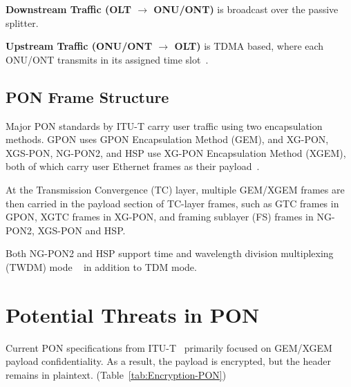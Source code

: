 \documentclass[sigconf]{acmart}
\begin{document}
\textbf{Downstream Traffic (OLT $\rightarrow$ ONU/ONT)} is broadcast over the passive splitter. 


\textbf{Upstream Traffic (ONU/ONT $\rightarrow$ OLT)} is TDMA based, where each ONU/ONT transmits in its assigned time slot~\cite{novelapon}. 



\subsection{PON Frame Structure}
Major PON standards by ITU-T carry user traffic using two encapsulation methods. GPON uses GPON Encapsulation Method (GEM), and XG-PON, XGS-PON, NG-PON2, and HSP use XG-PON Encapsulation Method (XGEM), both of which carry user Ethernet frames as their payload~\cite{itu-g9843,itu-XGPON,itu-XGSPON,itu-NGPON2,itu-50GPON}.

At the Transmission Convergence (TC) layer, multiple GEM/XGEM frames are then carried in the payload section of TC-layer frames, such as GTC frames in GPON, XGTC frames in XG-PON, and framing sublayer (FS) frames in NG-PON2, XGS-PON and HSP.

Both NG-PON2 and HSP support time and wavelength division multiplexing (TWDM) mode ~\cite{itu-NGPON2,itu-50GPON} in addition to TDM mode.


\section{Potential Threats in PON}
Current PON specifications from ITU-T~\cite{itu-g9843,itu-XGPON,itu-XGSPON,itu-NGPON2,itu-50GPON} primarily focused on GEM/XGEM payload confidentiality. As a result, the payload is encrypted, but the header remains in plaintext. (Table~\ref{tab:Encryption-PON})




\end{document}
